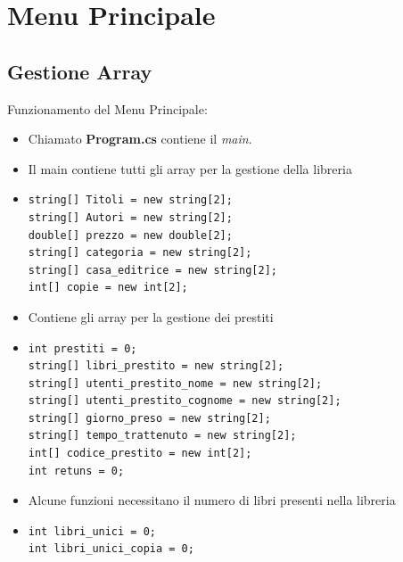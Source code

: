 \documentclass[a4paper,12pt]{article}
\begin{document}
\newpage


\section{Menu Principale}
\subsection{Gestione Array}
Funzionamento del Menu Principale:
\begin{itemize}
    \item Chiamato \textbf{Program.cs} contiene il \textit{main}.
    \item Il main contiene tutti gli array per la gestione della libreria
    \item \begin{lstlisting}[caption=Array della libreria]
string[] Titoli = new string[2];
string[] Autori = new string[2];
double[] prezzo = new double[2];
string[] categoria = new string[2];
string[] casa_editrice = new string[2];
int[] copie = new int[2];
        \end{lstlisting}
    \item Contiene gli array per la gestione dei prestiti
    \item \begin{lstlisting}[caption=Array dei prestiti]
int prestiti = 0;
string[] libri_prestito = new string[2];
string[] utenti_prestito_nome = new string[2];
string[] utenti_prestito_cognome = new string[2];
string[] giorno_preso = new string[2];
string[] tempo_trattenuto = new string[2];
int[] codice_prestito = new int[2];
int retuns = 0;
    \end{lstlisting}

    \item Alcune funzioni necessitano il numero di libri presenti nella libreria
    \item \begin{lstlisting}[caption=Funzione per il numero di libri]
int libri_unici = 0;
int libri_unici_copia = 0;
    \end{lstlisting}
\end{itemize}

\newpage
\end{document}
